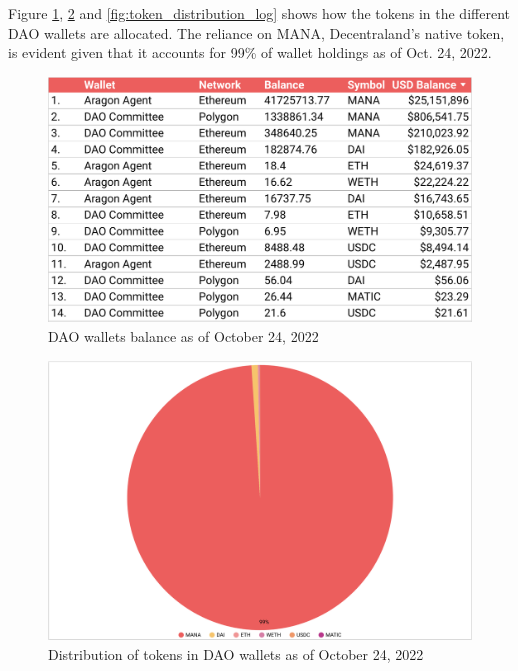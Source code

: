 \documentclass[MSE,Master,english]{twbook}%
\begin{document}
Figure \ref{fig:dao_balance}, \ref{fig:token_distribution} and \ref{fig:token_distribution_log} shows how the tokens in the different DAO wallets are allocated. The reliance on MANA, Decentraland's native token, is evident given that it accounts for 99\% of wallet holdings as of Oct. 24, 2022.
\begin{figure}[H]
  \centering
  \includegraphics[width=\textwidth]{metrics/dao_balance.png}
  \caption{DAO wallets balance as of October 24, 2022}
  \label{fig:dao_balance}
\end{figure}
\begin{figure}[H]
  \centering
  \includegraphics[width=\textwidth]{metrics/token_distribution.png}
  \caption{Distribution of tokens in DAO wallets as of October 24, 2022}
  \label{fig:token_distribution}
\end{figure}
\end{document}
